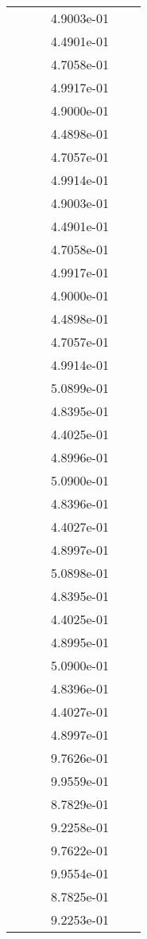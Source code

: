 \begin{xltabular}{\textwidth}{r|rS[table-format=1.3e+2]S[table-format=1.4e+2]S[table-format=1.4e+2]S[table-format=-1.5]}
&  &  & 4.9003e-01 & & \\
&  &  & 4.4901e-01 & & \\
&  &  & 4.7058e-01 & & \\
&  &  & 4.9917e-01 & & \\
&  &  & 4.9000e-01 & & \\
&  &  & 4.4898e-01 & & \\
&  &  & 4.7057e-01 & & \\
&  &  & 4.9914e-01 & & \\
&  &  & 4.9003e-01 & & \\
&  &  & 4.4901e-01 & & \\
&  &  & 4.7058e-01 & & \\
&  &  & 4.9917e-01 & & \\
&  &  & 4.9000e-01 & & \\
&  &  & 4.4898e-01 & & \\
&  &  & 4.7057e-01 & & \\
&  &  & 4.9914e-01 & & \\
&  &  & 5.0899e-01 & & \\
&  &  & 4.8395e-01 & & \\
&  &  & 4.4025e-01 & & \\
&  &  & 4.8996e-01 & & \\
&  &  & 5.0900e-01 & & \\
&  &  & 4.8396e-01 & & \\
&  &  & 4.4027e-01 & & \\
&  &  & 4.8997e-01 & & \\
&  &  & 5.0898e-01 & & \\
&  &  & 4.8395e-01 & & \\
&  &  & 4.4025e-01 & & \\
&  &  & 4.8995e-01 & & \\
&  &  & 5.0900e-01 & & \\
&  &  & 4.8396e-01 & & \\
&  &  & 4.4027e-01 & & \\
&  &  & 4.8997e-01 & & \\
&  &  & 9.7626e-01 & & \\
&  &  & 9.9559e-01 & & \\
&  &  & 8.7829e-01 & & \\
&  &  & 9.2258e-01 & & \\
&  &  & 9.7622e-01 & & \\
&  &  & 9.9554e-01 & & \\
&  &  & 8.7825e-01 & & \\
&  &  & 9.2253e-01 & & \\

\end{xltabular}
